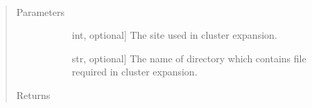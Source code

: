 \documentclass[letterpaper,10pt,english]{sphinxmanual}
\begin{document}
\begin{fulllineitems}
\begin{fulllineitems}
\end{fulllineitems}


\begin{fulllineitems}
\label{\detokenize{pygace.examples.hfo2:pygace.examples.hfo2.hfo2_gace.HFO2App.update_ce}}~\begin{quote}\begin{description}
\item[{Parameters}] \leavevmode\begin{description}
\item[{}] \leavevmode{[}int, optional{]}
The site used in cluster expansion.

\item[{}] \leavevmode{[}str, optional{]}
The name of directory which contains file required in cluster
expansion.

\end{description}

\item[{Returns}] \leavevmode\begin{description}
\item[{}] \leavevmode
\end{description}

\end{description}\end{quote}

\end{fulllineitems}


\end{fulllineitems}

\end{document}

